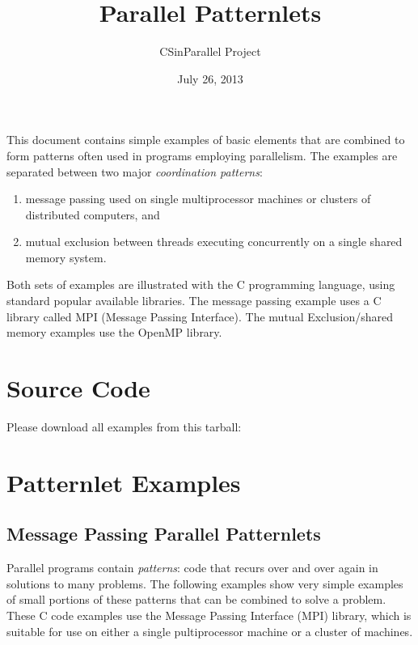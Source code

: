 \documentclass[letterpaper,10pt,openany,oneside]{sphinxmanual}
\title{Parallel Patternlets}
\date{July 26, 2013}
\author{CSinParallel Project}
\begin{document}
\maketitle
\tableofcontents
{}\label{index::doc}


This document contains simple examples of basic elements that are combined to form
patterns often used in
programs employing parallelism.  The examples are separated between
two major \emph{coordination patterns}:
\begin{enumerate}
\item {} 
message passing used on single multiprocessor machines or clusters of distributed computers, and

\item {} 
mutual exclusion between threads executing concurrently on a single shared memory system.

\end{enumerate}

Both sets of examples are illustrated
with the C programming language, using standard popular available libraries.
The message passing example uses
a C library called MPI (Message Passing Interface).  The mutual Exclusion/shared memory
examples use the OpenMP library.


\chapter{Source Code}
\label{index:source-code}\label{index:parallel-patternlets}
Please download all examples from this tarball:


\chapter{Patternlet Examples}
\label{index:patternlet-examples}

\section{Message Passing Parallel Patternlets}
\label{MessagePassing/MPI_Patternlets:message-passing-parallel-patternlets}\label{MessagePassing/MPI_Patternlets::doc}
Parallel programs contain \emph{patterns}:  code that recurs over and over again
in solutions to many problems.  The following examples show very simple
examples of small portions of
these patterns that can be combined to solve a problem.  These C code examples use the
Message Passing Interface (MPI) library, which is suitable for use on either a
single pultiprocessor machine or a cluster
of machines.
\end{document}
